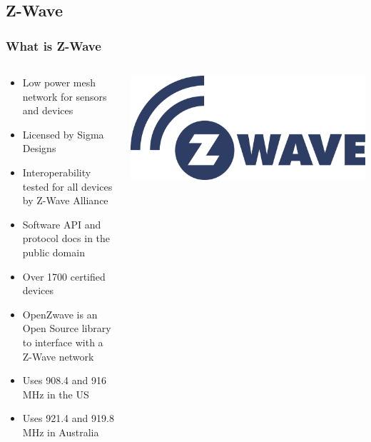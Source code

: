 \documentclass[aspectratio=169,11pt,hyperref={colorlinks=true}]{beamer}
\begin{document}
\subsection{Z-Wave}
\begin{frame}
    \frametitle{What is Z-Wave}
    \begin{columns}
        \begin{column}{.48\textwidth}
            \begin{itemize}
                \item Low power mesh network for sensors and devices
                \item Licensed by Sigma Designs
                \item Interoperability tested for all devices by Z-Wave Alliance
                \item Software API and protocol docs in the public domain
                \item Over 1700 certified devices
                \item OpenZwave is an Open Source library to interface with a Z-Wave network
                \item Uses 908.4 and 916 MHz in the US
                \item Uses 921.4 and 919.8 MHz in Australia
            \end{itemize}
        \end{column}
        \begin{column}{.48\textwidth}
            \includegraphics[width=\textwidth]{zwave.png}
        \end{column}
    \end{columns}
\end{frame}
\end{document}
